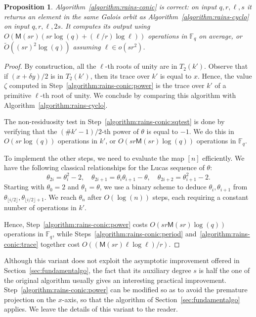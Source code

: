 \documentclass[12pt]{article}
\theoremstyle{plain}
\newtheorem{proposition}[theorem]{Proposition}
\theoremstyle{definition}
\newcommand{\tildO}{\tilde{O}}
\def\F{\ensuremath{\mathbb{F}}}
\def\MM{\ensuremath{\mathsf{M}}}
\newcounter{algorithm}
\begin{document}
\begin{proposition}
  Algorithm~\ref{algorithm:rains-conic} is correct: on input
  $q,r,\ell,s$ it returns an element in the same Galois orbit as
  Algorithm~\ref{algorithm:rains-cyclo} on input $q,r,\ell,2s$. %
  It computes its output using $O(\MM(sr)(sr\log(q)+(\ell/r)\log\ell))$
  operations in $\F_q$ on average, or $\tildO((sr)^2\log(q))$ assuming
  $\ell\in o(sr^2)$.
\end{proposition}
\begin{proof}
  By construction, all the $\ell$-th roots of unity are in
  $T_2(k')$. %
  Observe that if $(x+\delta y)/2$ is in $T_2(k')$, then its trace
  over $k'$ is equal to $x$. %
  Hence, the value $\zeta$ computed in
  Step~\ref{algorithm:rains-conic:power} is the trace over $k'$ of a
  primitive $\ell$-th root of unity. %
  We conclude by comparing this algorithm with
  Algorithm~\ref{algorithm:rains-cyclo}.

  The non-residuosity test in Step~\ref{algorithm:rains-conic:sqtest}
  is done by verifying that the $(\#k'-1)/2$-th power of $\theta$ is
  equal to $-1$. %
  We do this in $O(sr\log(q))$ operations in $k'$, or
  $O(sr\MM(sr)\log(q))$ operations in $\F_q$.

  To implement the other steps, we need to evaluate the map $[n]$
  efficiently. %
  We have the following classical relationships for the Lucas sequence
  of $\theta$:
  \begin{equation*}
    \theta_{2i} = \theta_{i}^2-2,\quad
    \theta_{2i+1} = \theta_i\theta_{i+1} - \theta,\quad
    \theta_{2i+2} = \theta_{i+1}^2-2.
  \end{equation*}
  Starting with $\theta_0=2$ and $\theta_1=\theta$, we use a binary
  scheme to deduce $\theta_i,\theta_{i+1}$ from
  $\theta_{\lfloor i/2\rfloor},\theta_{\lfloor i/2\rfloor+1}$. %
  We reach $\theta_n$ after $O(\log(n))$ steps, each requiring a
  constant number of operations in $k'$.

  Hence, Step~\ref{algorithm:rains-conic:power} costs
  $O(sr\MM(sr)\log(q))$ operations in $\F_q$, while
  Steps~\ref{algorithm:rains-conic:period}
  and~\ref{algorithm:rains-conic:trace} together cost
  $O((\MM(sr)\ell\log\ell)/r)$.
\end{proof}

Although this variant does not exploit the asymptotic improvement
offered in Section~\ref{sec:fundamentalgo}, the fact that its
auxiliary degree $s$ is half the one of the original algorithm usually
gives an interesting practical improvement. %
Step~\ref{algorithm:rains-conic:power} can be modified so as to avoid
the premature projection on the $x$-axis, so that the algorithm of
Section~\ref{sec:fundamentalgo} applies. %
We leave the details of this variant to the reader.
\end{document}
